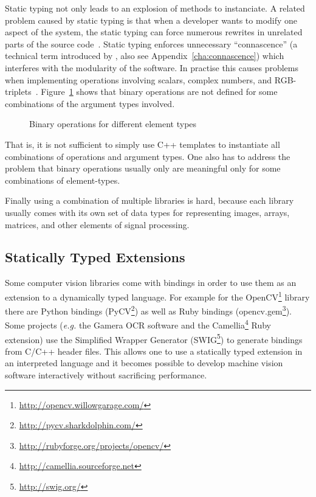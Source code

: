 \documentclass[12pt,a4paper,oneside,openright]{book}
\newcommand{\eg}{\emph{e.g.} }
\newcommand{\Eg}{For example }
\newcommand{\Ie}{That is, }
\newcommand{\anx}[1]{Appendix~\ref{cha:#1}}
\newcommand{\fig}[1]{Figure~\ref{fig:#1}}
\begin{document}
\begin{CJK}{UTF8}{}
Static typing not only leads to an explosion of methods to instanciate. A related problem caused by static typing is that when a developer wants to modify one aspect of the system, the static typing can force numerous rewrites in unrelated parts of the source code~\citep{RefWorks:486}. Static typing enforces unnecessary ``connascence'' (a technical term introduced by \citet{weirich2009}, also see \anx{connascence}) which interferes with the modularity of the software.
In practise this causes problems when implementing operations involving scalars, complex numbers, and \acs{RGB}-triplets~\citep{RefWorks:560}. \fig{ops} shows that binary operations are not defined for some combinations of the argument types involved.
\begin{figure}[htbp]
  \begin{center}
    \caption{Binary operations for
      different element types~\citep{RefWorks:560}\label{fig:ops}}
  \end{center}
\end{figure}
\Ie it is not sufficient to simply use C++ templates to instantiate all combinations of operations and argument types. One also has to address the problem that binary operations usually only are meaningful only for some combinations of element-types.

Finally using a combination of multiple libraries is hard, because each library usually comes with its own set of data types for representing images, arrays, matrices, and other elements of signal processing.

\subsection{Statically Typed Extensions}\label{cha:staticext}
Some computer vision libraries come with bindings in order to use them as an extension to a dynamically typed language. \Eg for the OpenCV\footnote{\url{http://opencv.willowgarage.com/}} library there are Python bindings (PyCV\footnote{\url{http://pycv.sharkdolphin.com/}}) as well as Ruby bindings (opencv.gem\footnote{\url{http://rubyforge.org/projects/opencv/}}). Some projects (\eg the Gamera \ac{OCR} software \citep{Droettboom03thegamera} and the Camellia\footnote{\url{http://camellia.sourceforge.net}} Ruby extension) use the Simplified Wrapper Generator (SWIG\footnote{\url{http://swig.org/}}) to generate bindings from C/C++ header files. This allows one to use a statically typed extension in an interpreted language and it becomes possible to develop machine vision software interactively without sacrificing performance.


\end{CJK}
\end{document}
